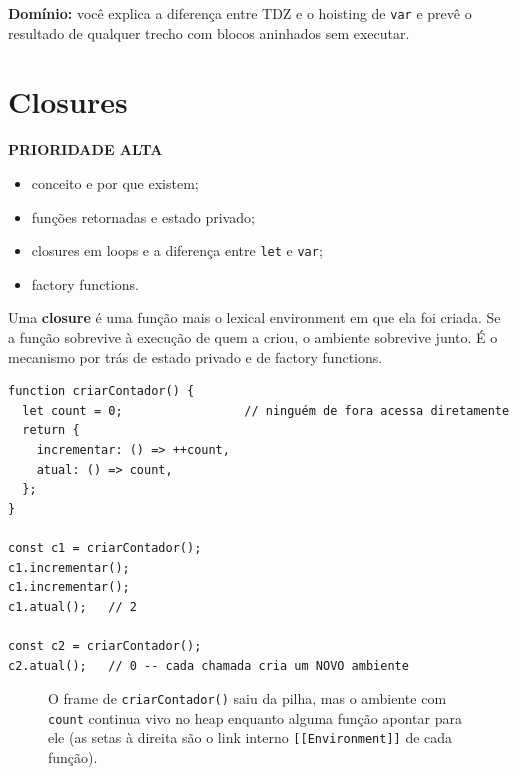 \documentclass[12pt,a4paper,oneside]{book}
\newcommand{\alta}{\colorbox{red!15}{\sffamily\scriptsize\bfseries PRIORIDADE ALTA}}
\newcommand{\code}[1]{\texttt{#1}}
\newcommand{\dom}[1]{\begin{dominio}\textbf{Domínio:} #1\end{dominio}}
\begin{document}
\dom{você explica a diferença entre TDZ e o hoisting de \code{var} e prevê o resultado de qualquer trecho com blocos aninhados sem executar.}

\section{Closures}
\label{sec:closures}
\alta

\begin{itemize}
  \item conceito e por que existem;
  \item funções retornadas e estado privado;
  \item closures em loops e a diferença entre \code{let} e \code{var};
  \item factory functions.
\end{itemize}

Uma \textbf{closure} é uma função mais o lexical environment em que ela foi criada. Se a função sobrevive à execução de quem a criou, o ambiente sobrevive junto. É o mecanismo por trás de estado privado e de factory functions.

\begin{verbatim}
function criarContador() {
  let count = 0;                 // ninguém de fora acessa diretamente
  return {
    incrementar: () => ++count,
    atual: () => count,
  };
}

const c1 = criarContador();
c1.incrementar();
c1.incrementar();
c1.atual();   // 2

const c2 = criarContador();
c2.atual();   // 0 -- cada chamada cria um NOVO ambiente
\end{verbatim}

\begin{figure}[h]
\centering
{}
\caption{O frame de \texttt{criarContador()} saiu da pilha, mas o ambiente com \texttt{count} continua vivo no heap enquanto alguma função apontar para ele (as setas à direita são o link interno \texttt{[[Environment]]} de cada função).}
\end{figure}
\end{document}
